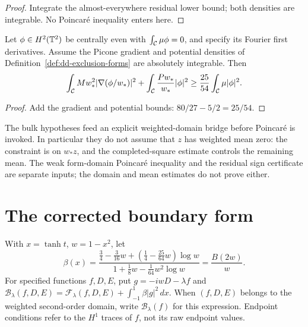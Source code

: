 \begin{proof}
\leanok
Integrate the almost-everywhere residual lower bound; both densities
are integrable. No Poincar\'e inequality enters here.
\end{proof}

\begin{lemma}
\label{lem:dd-bulk-picone}
\leanok
Let $\phi\in H^2(\mathbb{T}^2)$ be centrally even with
$\int_{\mathcal{C}}\mu\phi=0$, and specify its Fourier first derivatives.
Assume the Picone gradient and potential densities of
Definition~\ref{def:dd-exclusion-forms} are absolutely integrable. Then
\[
  \int_{\mathcal{C}} Mw_*^2|\nabla(\phi/w_*)|^2+\int_{\mathcal{C}}\frac{Pw_*}{w_*}|\phi|^2
  \ge\frac{25}{54}\int_{\mathcal{C}}\mu|\phi|^2 .
\]
\end{lemma}

\begin{proof}
\leanok
Add the gradient and potential bounds:
$80/27-5/2=25/54$.
\end{proof}

\begin{remark}
The bulk hypotheses feed an explicit weighted-domain bridge before
Poincar\'e is invoked. In particular they do not assume that $z$ has
weighted mean zero: the constraint is on $w_*z$, and the completed-square
estimate controls the remaining mean. The weak form-domain Poincar\'e inequality and the
residual sign certificate are separate inputs; the domain and mean
estimates do not prove either.
\end{remark}

\section{The corrected boundary form}

\begin{definition}
\label{def:corrected-boundary-form}
\leanok
With $x=\tanh t$, $w=1-x^2$, let
\[
  \beta(x)=\frac{\tfrac34-\tfrac3{16}w+(\tfrac14-\tfrac{25}{64}w)\log w}
               {1+\tfrac18w-\tfrac1{64}w^2\log w}=\frac{B(2w)}w .
\]
For specified functions $f,D,E$, put $g=-iwD-\lambda f$ and
$\mathcal B_\lambda(f,D,E)=\mathcal F_\lambda(f,D,E)
+\int_{-1}^1\beta|g|^2\,dx$.
When $(f,D,E)$ belongs to the weighted second-order domain, write
$\mathcal B_\lambda(f)$ for this expression. Endpoint conditions refer to
the $H^1$ traces of $f$, not its raw endpoint values.
\end{definition}

